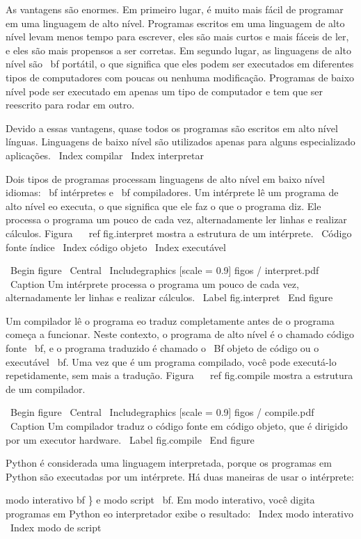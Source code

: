 \documentclass[10pt]{book}
\begin{document}
\begin {itemize}
As vantagens são enormes. Em primeiro lugar, é muito mais fácil de programar
em uma linguagem de alto nível. Programas escritos em uma linguagem de alto nível
levam menos tempo para escrever, eles são mais curtos e mais fáceis de ler, e eles
são mais propensos a ser corretas. Em segundo lugar, as linguagens de alto nível são {\ bf
portátil}, o que significa que eles podem ser executados em diferentes tipos de computadores
com poucas ou nenhuma modificação. Programas de baixo nível pode ser executado em apenas um
tipo de computador e tem que ser reescrito para rodar em outro.

Devido a essas vantagens, quase todos os programas são escritos em alto nível
línguas. Linguagens de baixo nível são utilizados apenas para alguns especializado
aplicações.
\ Index {} compilar
\ Index {interpretar}

Dois tipos de programas processam linguagens de alto nível em baixo nível
idiomas: {\ bf intérpretes} e {\ bf compiladores}. Um intérprete
lê um programa de alto nível eo executa, o que significa que ele faz o que
o programa diz. Ele processa o programa um pouco de cada vez,
alternadamente ler linhas e realizar cálculos.
Figura ~ \ ref {fig.interpret} mostra a estrutura de um intérprete.
\ {Código fonte} índice
\ Index {código objeto}
\ Index {executável}

\ Begin {figure}
\ Central
{\ Includegraphics [scale = 0.9] {figos / interpret.pdf}}
\ Caption {Um intérprete processa o programa um pouco de cada vez,
alternadamente ler linhas e realizar cálculos.}
\ Label {} fig.interpret
\ End {figure}

Um compilador lê o programa eo traduz completamente antes de o
programa começa a funcionar. Neste contexto, o programa de alto nível é
o chamado código fonte {\ bf}, e o programa traduzido é chamado o
{\ Bf objeto de código} ou {o executável \ bf}. Uma vez que é um programa
compilado, você pode executá-lo repetidamente, sem mais a tradução.
Figura ~ \ ref {fig.compile} mostra a estrutura de um compilador.

\ Begin {figure}
\ Central
{\ Includegraphics [scale = 0.9] {figos / compile.pdf}}
\ Caption {Um compilador traduz o código fonte em código objeto, que é
dirigido por um executor hardware.}
\ Label {} fig.compile
\ End {figure}

Python é considerada uma linguagem interpretada, porque os programas em Python
são executadas por um intérprete. Há duas maneiras de usar o
intérprete: {modo interativo bf \} e {modo script \ bf}. Em
modo interativo, você digita programas em Python eo interpretador exibe
o resultado:
\ Index {modo interativo}
\ Index {modo de script}

}
\end{itemize}
\end{document}
